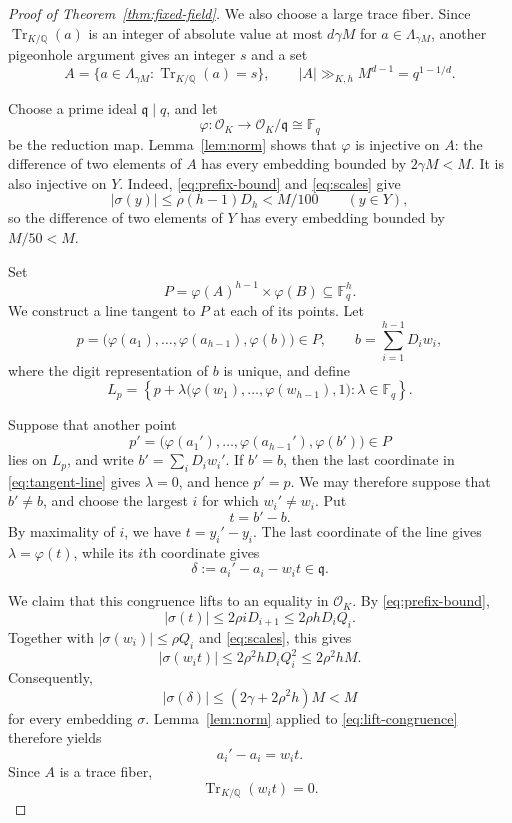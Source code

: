 \documentclass[11pt]{article}
\theoremstyle{plain}
\theoremstyle{remark}
\newcommand{\F}{\mathbb F}
\newcommand{\Q}{\mathbb Q}
\newcommand{\OK}{\mathcal O_K}
\newcommand{\Tr}{\operatorname{Tr}_{K/\Q}}
\begin{document}
\begin{proof}[Proof of Theorem~\ref{thm:fixed-field}]
We also choose a large trace fiber.  Since $\Tr(a)$ is an integer of absolute
value at most $d\gamma M$ for $a\in\Lambda_{\gamma M}$, another pigeonhole
argument gives an integer $s$ and a set
\begin{equation}\label{eq:A-size}
  A=\{a\in\Lambda_{\gamma M}:\Tr(a)=s\},
  \qquad
  |A|\gg_{K,h}M^{d-1}=q^{1-1/d}.
\end{equation}

Choose a prime ideal $\mathfrak q\mid q$, and let
\[
  \varphi:\OK\longrightarrow\OK/\mathfrak q\cong\F_q
\]
be the reduction map.  Lemma~\ref{lem:norm} shows that $\varphi$ is injective
on $A$: the difference of two elements of $A$ has every embedding bounded by
$2\gamma M<M$.  It is also injective on $Y$.  Indeed,
\eqref{eq:prefix-bound} and \eqref{eq:scales} give
\[
  |\sigma(y)|\leq\rho(h-1)D_h<M/100
  \qquad(y\in Y),
\]
so the difference of two elements of $Y$ has every embedding bounded by
$M/50<M$.

Set
\begin{equation}\label{eq:P}
  P=\varphi(A)^{h-1}\times\varphi(B)\subseteq\F_q^h.
\end{equation}
We construct a line tangent to $P$ at each of its points.  Let
\[
  p=\bigl(\varphi(a_1),\ldots,\varphi(a_{h-1}),\varphi(b)\bigr)\in P,
  \qquad
  b=\sum_{i=1}^{h-1}D_iw_i,
\]
where the digit representation of $b$ is unique, and define
\begin{equation}\label{eq:tangent-line}
  L_p=
  \left\{
  p+\lambda\bigl(\varphi(w_1),\ldots,\varphi(w_{h-1}),1\bigr):
  \lambda\in\F_q
  \right\}.
\end{equation}

Suppose that another point
\[
  p'=\bigl(\varphi(a_1'),\ldots,\varphi(a_{h-1}'),\varphi(b')\bigr)\in P
\]
lies on $L_p$, and write $b'=\sum_iD_iw_i'$.  If $b'=b$, then the last
coordinate in \eqref{eq:tangent-line} gives $\lambda=0$, and hence $p'=p$.
We may therefore suppose that $b'\neq b$, and choose the
largest $i$ for which $w_i'\neq w_i$.  Put
\[
  t=b'-b.
\]
By maximality of $i$, we have $t=y_i'-y_i$.  The last coordinate of the line
gives $\lambda=\varphi(t)$, while its $i$th coordinate gives
\begin{equation}\label{eq:lift-congruence}
  \delta:=a_i'-a_i-w_it\in\mathfrak q.
\end{equation}

We claim that this congruence lifts to an equality in $\OK$.  By
\eqref{eq:prefix-bound},
\[
  |\sigma(t)|\leq2\rho iD_{i+1}
  \leq2\rho hD_iQ_i.
\]
Together with $|\sigma(w_i)|\leq\rho Q_i$ and \eqref{eq:scales}, this gives
\[
  |\sigma(w_it)|
  \leq2\rho^2hD_iQ_i^2
  \leq2\rho^2hM.
\]
Consequently,
\[
  |\sigma(\delta)|
  \leq(2\gamma+2\rho^2h)M<M
\]
for every embedding $\sigma$.  Lemma~\ref{lem:norm} applied to
\eqref{eq:lift-congruence} therefore yields
\begin{equation}\label{eq:lifted-equality}
  a_i'-a_i=w_it.
\end{equation}
Since $A$ is a trace fiber,
\begin{equation}\label{eq:orthogonality}
  \Tr(w_it)=0.
\end{equation}


\end{proof}
\end{document}

